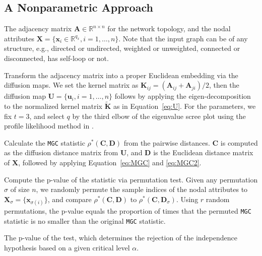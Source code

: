 \documentclass[11pt]{article}
\theoremstyle{definition}
\begin{document}
\subsection{A Nonparametric Approach}
\label{ssec:method}
\begin{description}[align=left]
\item [Input: ]  The adjacency matrix $\mathbf{A} \in \mathbb{R}^{n \times n}$ for the network topology, and the nodal attributes $\mathbf{X}=\{\mathbf{x}_i \in \mathbb{R}^{q_{x}}, i=1,\ldots,n\}$. Note that the input graph can be of any structure, e.g., directed or undirected, weighted or unweighted, connected or disconnected, has self-loop or not. 

\item [Step 1:] Transform the adjacency matrix into a proper Euclidean embedding via the diffusion maps. We set the kernel matrix as $\mathbf{K}_{ij}=(\mathbf{A}_{ij}+\mathbf{A}_{ji})/2$, then the diffusion map $\mathbf{U}=\{\mathbf{u}_{i},i=1,\ldots,n\}$ follows by applying the eigen-decomposition to the normalized kernel matrix $\mathbf{\widetilde{K}}$ as in Equation~\ref{eq:U}. For the parameters, we fix $t=3$, and select $q$ by the third elbow of the eigenvalue scree plot using the profile likelihood method in \cite{ZhuGhodsi2006}.

\item [Step 2:] Calculate the \texttt{MGC} statistic $\rho^{*}(\mathbf{C}, \mathbf{D})$ from the pairwise distances. $\mathbf{C}$ is computed as the diffusion distance matrix from $\mathbf{U}$, and $\mathbf{D}$ is the Euclidean distance matrix of $\mathbf{X}$, followed by applying Equation~\ref{eq:MGC} and \ref{eq:MGC2}.

\item [Step 3:] Compute the p-value of the statistic via permutation test. Given any permutation $\sigma$ of size $n$, we randomly permute the sample indices of the nodal attributes to $\mathbf{X}_{\sigma}=\{\mathbf{x}_{\sigma(i)}\}$, and compare $\rho^{*}(\mathbf{C}, \mathbf{D})$ to $\rho^{*}(\mathbf{C}, \mathbf{D}_{\sigma})$. Using $r$ random permutations, the p-value equals the proportion of times that the permuted \texttt{MGC} statistic is no smaller than the original \texttt{MGC} statistic. 

\item [Output:] The p-value of the test, which determines the rejection of the independence hypothesis based on a given critical level $\alpha$.
\end{description}
\end{document}
